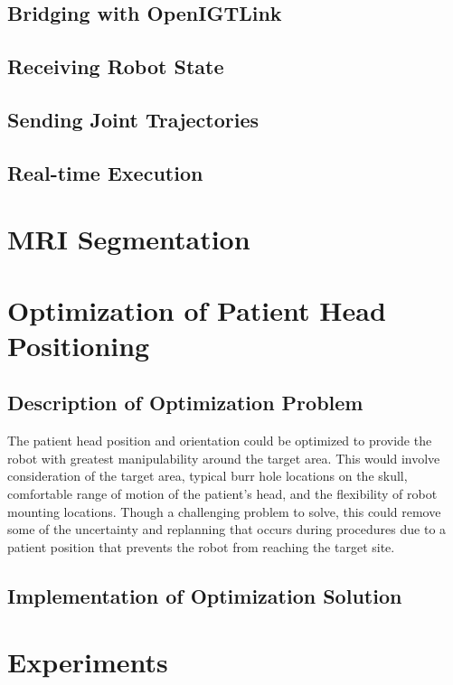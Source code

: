 \documentclass[12pt]{report}
\begin{document}
\section{Bridging with OpenIGTLink}
\section{Receiving Robot State}
\section{Sending Joint Trajectories}
\section{Real-time Execution}

\chapter{MRI Segmentation}

\chapter{Optimization of Patient Head Positioning}
\section{Description of Optimization Problem}
The patient head position and orientation could be optimized to provide the robot with greatest manipulability around the target area. This would involve consideration of the target area, typical burr hole locations on the skull, comfortable range of motion of the patient’s head, and the flexibility of robot mounting locations. Though a challenging problem to solve, this could remove some of the uncertainty and replanning that occurs during procedures due to a patient position that prevents the robot from reaching the target site.
\section{Implementation of Optimization Solution}

\chapter{Experiments}
\end{document}
